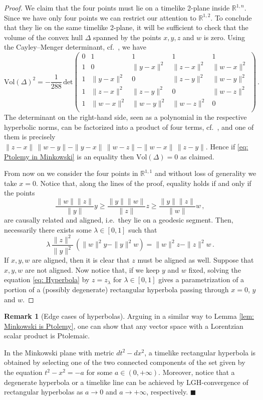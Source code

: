 \documentclass[hidelinks,12pt,a4paper]{article}
\numberwithin{equation}{section}
\theoremstyle{plain}
\theoremstyle{definition}
\newtheorem{remark}[definition]{Remark}
\begin{document}
\begin{proof}
We claim that the four points must lie on a timelike 2-plane inside $\mathbb R^{1,n}$. 
Since we have only four points we can restrict our attention to $\mathbb R^{1,2}$. 
To conclude that they lie on the same timelike 2-plane, it will be sufficient to check that the volume of the convex hull $\Delta$ spanned by the points $x,y,z$ and $w$ is zero. 
Using the Cayley--Menger determinant, cf.\ \cite[Section 9.7.3]{Berger}, we have
\[
\text{Vol}  (\Delta)^2 = - \frac{1}{288} \, \text{det} \begin{pmatrix}
0 & 1 & 1 & 1 & 1 \\
1 & 0 & \| y-x\|^2 & \|z-x\|^2 & \|w- x\|^2 \\
1 & \|y-x\|^2 & 0 & \|z-y\|^2 & \| w-y\|^2 \\
1 & \|z-x\|^2 & \|z-y\|^2 & 0 & \|w-z\|^2 \\
1 & \|w-x\|^2 & \| w-y\|^2 & \|w-z\|^2 & 0 \\ 
\end{pmatrix} \, .
\]
The determinant on the right-hand side, seen as a polynomial in the respective hyperbolic norms, can be factorized into a product of four terms, cf.\ \cite{Berger}, and one of them is precisely $\| z-x \| \, \| w-y \|- \| y-x \| \, \| w-z \| - \| w-x \| \, \|z-y\|$. 
Hence if \eqref{eq: Ptolemy in Minkowski} is an equality then $\text{Vol}(\Delta)=0$ as claimed. 

From now on we consider the four points in $\mathbb R^{1,1}$ and without loss of generality we take $x=0$. 
Notice that, along the lines of the proof, equality holds if and only if the points
\[
\frac{\|w\| \|z\|}{\|y\|} y \geq \frac{\|y\| \|w\|}{\|z\|}z \geq \frac{\|y\| \|z\|}{\|w\|} w\, ,
\]
are causally related and aligned, i.e.\ they lie on a geodesic segment. Then, necessarily there exists some $\lambda \in [0,1]$ such that
\begin{equation} \label{eq: Hyperbola}
    \lambda \, \frac{\|z\|^2}{\|y\|^2} \, ( \|w\| ^2 y - \|y\|^2 w) = \|w\|^2 z - \|z\|^2 w \, .
\end{equation}
If $x,y,w$ are aligned, then it is clear that $z$ must be aligned as well. 
Suppose that $x,y,w$ are not aligned.
Now notice that, if we keep $y$ and $w$ fixed, solving the equation \eqref{eq: Hyperbola} by $z= z_{\lambda}$ for $\lambda \in [0,1]$ gives a parametrization of a portion of a (possibly degenerate) rectangular hyperbola passing through $x=0$, $y$ and $w$.
\end{proof}

\begin{remark}[Edge cases of hyperbolas]
Arguing in a similar way to Lemma \ref{lem: Minkowski is Ptolemy}, one can show that any vector space with a Lorentzian scalar product is Ptolemaic. 

In the Minkowski plane with metric $d t^2 - d x^2$, a timelike rectangular hyperbola is obtained by selecting one of the two connected components of the set given by the equation $t^2-x^2 = -a$ for some $a \in (0, +\infty)$. Moreover, notice that a degenerate hyperbola or a timelike line can be achieved by LGH-convergence of rectangular hyperbolas as $a \rightarrow 0$ and $a \rightarrow +\infty$, respectively.
\hfill$\blacksquare$ 
\end{remark}
\end{document}

